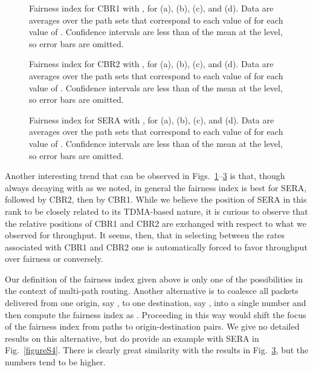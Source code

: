 \documentclass{article}
\begin{document}
\begin{figure}[p]
\centering
{}
\caption{Fairness index for CBR1 with , for  (a), 
(b),  (c), and  (d). Data are averages over the 
path sets that correspond to each value of  for each value of .
Confidence intervals are less than  of the mean at the  level, so
error bars are omitted.}
\label{figure7}
\end{figure}

\begin{figure}[p]
\centering
{}
\caption{Fairness index for CBR2 with , for  (a), 
(b),  (c), and  (d). Data are averages over the 
path sets that correspond to each value of  for each value of .
Confidence intervals are less than  of the mean at the  level, so
error bars are omitted.}
\label{figure8}
\end{figure}

\begin{figure}[p]
\centering
{}
\caption{Fairness index for SERA with , for  (a), 
(b),  (c), and  (d). Data are averages over the 
path sets that correspond to each value of  for each value of .
Confidence intervals are less than  of the mean at the  level, so
error bars are omitted.}
\label{figure9}
\end{figure}

Another interesting trend that can be observed in
Figs.~\ref{figure7}--\ref{figure9} is that, though always decaying with 
as we noted, in general the fairness index is best for SERA, followed by CBR2,
then by CBR1. While we believe the position of SERA in this rank to be closely
related to its TDMA-based nature, it is curious to observe that the relative
positions of CBR1 and CBR2 are exchanged with respect to what we observed for
throughput. It seems, then, that in selecting between the rates associated with
CBR1 and CBR2 one is automatically forced to favor throughput over fairness or
conversely.

Our definition of the fairness index given above is only one of the
possibilities in the context of multi-path routing. Another alternative is to
coalesce all packets delivered from one origin, say , to one destination, say
, into a single number  and then compute the fairness index as
. Proceeding in
this way would shift the focus of the fairness index from paths to
origin-destination pairs. We give no detailed results on this alternative, but
do provide an example with SERA in Fig.~\ref{figureS4}. There is clearly great
similarity with the results in Fig.~\ref{figure9}, but the numbers tend to be
higher.
\end{document}
